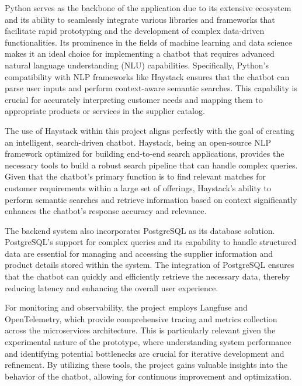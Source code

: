 
Python serves as the backbone of the application due to its extensive ecosystem and its ability to seamlessly integrate various libraries and frameworks that facilitate rapid prototyping and the development of complex data-driven functionalities. Its prominence in the fields of machine learning and data science makes it an ideal choice for implementing a chatbot that requires advanced natural language understanding (NLU) capabilities. Specifically, Python's compatibility with NLP frameworks like Haystack ensures that the chatbot can parse user inputs and perform context-aware semantic searches. This capability is crucial for accurately interpreting customer needs and mapping them to appropriate products or services in the supplier catalog.

The use of Haystack within this project aligns perfectly with the goal of creating an intelligent, search-driven chatbot. Haystack, being an open-source NLP framework optimized for building end-to-end search applications, provides the necessary tools to build a robust search pipeline that can handle complex queries. Given that the chatbot’s primary function is to find relevant matches for customer requirements within a large set of offerings, Haystack’s ability to perform semantic searches and retrieve information based on context significantly enhances the chatbot’s response accuracy and relevance.


The backend system also incorporates PostgreSQL as its database solution. PostgreSQL’s support for complex queries and its capability to handle structured data are essential for managing and accessing the supplier information and product details stored within the system. The integration of PostgreSQL ensures that the chatbot can quickly and efficiently retrieve the necessary data, thereby reducing latency and enhancing the overall user experience.


For monitoring and observability, the project employs Langfuse and OpenTelemetry, which provide comprehensive tracing and metrics collection across the microservices architecture. This is particularly relevant given the experimental nature of the prototype, where understanding system performance and identifying potential bottlenecks are crucial for iterative development and refinement. By utilizing these tools, the project gains valuable insights into the behavior of the chatbot, allowing for continuous improvement and optimization.

